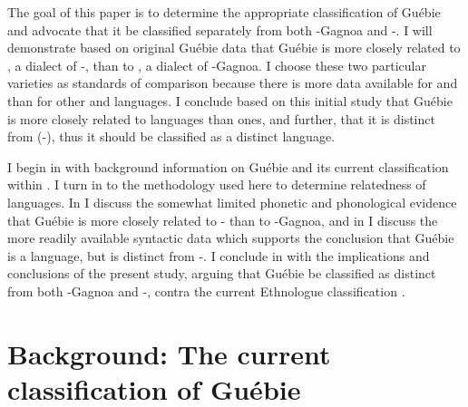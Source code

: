 \documentclass[output=paper,modfonts]{langscibook}
\begin{document}
The goal of this paper is to determine the appropriate classification of Guébie and advocate that it be classified separately from both -Gagnoa and -. I will demonstrate based on original Guébie data that Guébie is more closely related to , a dialect of -, than to , a dialect of -Gagnoa. I choose these two particular varieties as standards of comparison because there is more data available for  and  than for other  and  languages. I conclude based on this initial study that Guébie is more closely related to  languages than  ones, and further, that it is distinct from  (-), thus it should be classified as a distinct  language.

I begin in  with background information on Guébie and its current classification within . I turn in  to the methodology used here to determine relatedness of languages. In  I discuss the somewhat limited phonetic and phonological evidence that Guébie is more closely related to - than to -Gagnoa, and in  I discuss the more readily available syntactic data which supports the conclusion that Guébie is a  language, but is distinct from -. I conclude in  with the implications and conclusions of the present study, arguing that Guébie be classified as distinct from both -Gagnoa and -, contra the current Ethnologue classification \citep{LewisEtAl2013}.


\section{Background: The current classification of Guébie}\label{sec:sande:Background}
\end{document}
